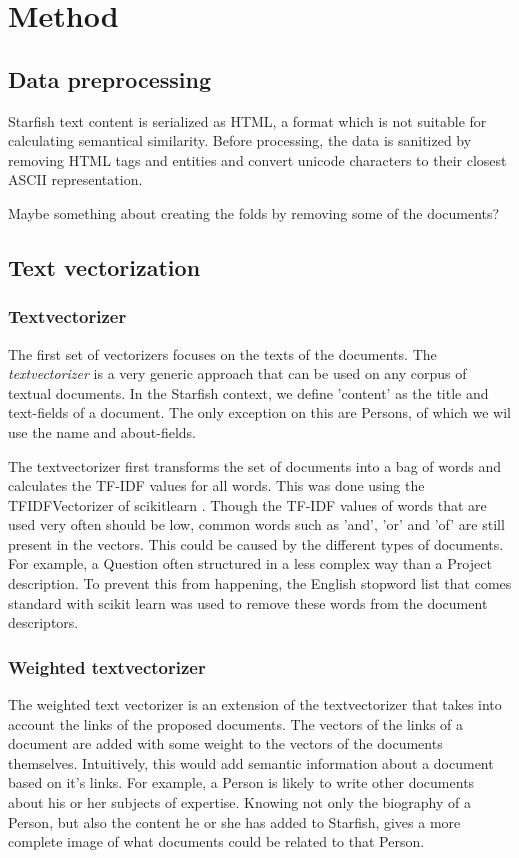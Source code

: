 \section{Method}

\subsection{Data preprocessing}
Starfish text content is serialized as HTML, a format which is not suitable for calculating semantical similarity. Before processing, the data is sanitized by removing HTML tags and entities and convert unicode characters to their closest ASCII representation.

Maybe something about creating the folds by removing some of the documents?

\subsection{Text vectorization}
\subsubsection{Textvectorizer}

The first set of vectorizers focuses on the texts of the documents. The \emph{textvectorizer} is a very generic approach that can be used on any corpus of textual documents. In the Starfish context, we define 'content' as the title and text-fields of a document. The only exception on this are Persons, of which we wil use the name and about-fields. 

The textvectorizer first transforms the set of documents into a bag of words and calculates the TF-IDF values for all words. This was done using the TFIDFVectorizer of scikitlearn \citep{scikit-learn}.  Though the TF-IDF values of words that are used very often should be low, common words such as 'and', 'or' and 'of' are still present in the vectors. This could be caused by the different types of documents. For example, a Question often structured in a less complex way than a Project description. To prevent this from happening, the English stopword list that comes standard with scikit learn was used to remove these words from the document descriptors.

\subsubsection{Weighted textvectorizer}
The weighted text vectorizer is an extension of the textvectorizer that takes into account the links of the proposed documents. The vectors of the links of a document are added with some weight to the vectors of the documents themselves. Intuitively, this would add semantic information about a document based on it's links. For example, a Person is likely to write other documents about his or her subjects of expertise. Knowing not only the biography of a Person, but also the content he or she has added to Starfish, gives a more complete image of what documents could be related to that Person.

